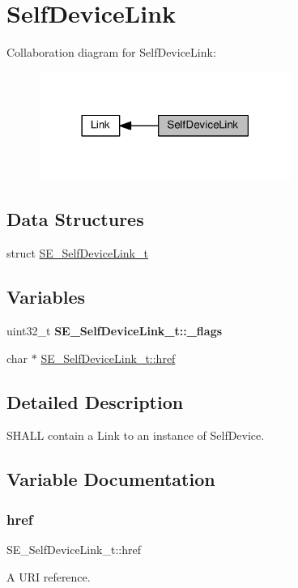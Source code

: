 \hypertarget{group__SelfDeviceLink}{}\section{Self\+Device\+Link}
\label{group__SelfDeviceLink}
Collaboration diagram for Self\+Device\+Link\+:\nopagebreak
\begin{figure}[H]
\begin{center}
\leavevmode
\includegraphics[width=234pt]{group__SelfDeviceLink}
\end{center}
\end{figure}
\subsection*{Data Structures}
\begin{DoxyCompactItemize}
\item 
struct \hyperlink{structSE__SelfDeviceLink__t}{S\+E\+\_\+\+Self\+Device\+Link\+\_\+t}
\end{DoxyCompactItemize}
\subsection*{Variables}
\begin{DoxyCompactItemize}
\item 
\mbox{\label{group__SelfDeviceLink_gad68636a467615d89d8b324643116e8cc}} 
uint32\+\_\+t {\bfseries S\+E\+\_\+\+Self\+Device\+Link\+\_\+t\+::\+\_\+flags}
\item 
char $\ast$ \hyperlink{group__SelfDeviceLink_gaa2cb12576a1aff3304435ed73e86e4e4}{S\+E\+\_\+\+Self\+Device\+Link\+\_\+t\+::href}
\end{DoxyCompactItemize}


\subsection{Detailed Description}
S\+H\+A\+LL contain a Link to an instance of Self\+Device. 

\subsection{Variable Documentation}
\mbox{\label{group__SelfDeviceLink_gaa2cb12576a1aff3304435ed73e86e4e4}} 
\subsubsection{\texorpdfstring{href}{href}}
{\footnotesize\ttfamily S\+E\+\_\+\+Self\+Device\+Link\+\_\+t\+::href}

A U\+RI reference. 